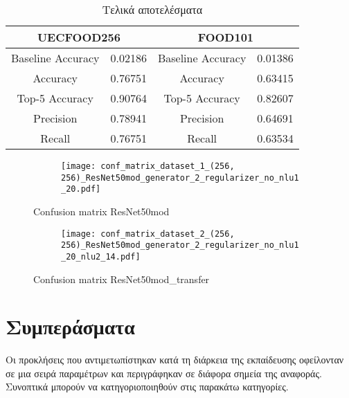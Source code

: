 \begin{table}[H]
\centering
\begin{tabular}{|cc|cc|}
\hline
\multicolumn{2}{|c|}{UECFOOD256}         & \multicolumn{2}{c|}{FOOD101}            \\ \hline
\multicolumn{1}{|c|}{Baseline Accuracy}  & 0.02186 & \multicolumn{1}{c|}{Baseline Accuracy}       & 0.01386 \\ \hline
\multicolumn{1}{|c|}{Accuracy}       & 0.76751 & \multicolumn{1}{c|}{Accuracy}       & 0.63415 \\ \hline
\multicolumn{1}{|c|}{Top-5 Accuracy} & 0.90764 & \multicolumn{1}{c|}{Top-5 Accuracy} & 0.82607 \\ \hline
\multicolumn{1}{|c|}{Precision}      & 0.78941 & \multicolumn{1}{c|}{Precision}      & 0.64691 \\ \hline
\multicolumn{1}{|c|}{Recall}         & 0.76751 & \multicolumn{1}{c|}{Recall}         & 0.63534 \\ \hline
\end{tabular}
\caption{Τελικά αποτελέσματα}
\label{final_results_table}
\end{table}


\begin{figure}[H]
\centering
\begin{subfigure}[t]{1.0\textwidth}%
\texttt{[image: conf\_matrix\_dataset\_1\_(256, 256)\_ResNet50mod\_generator\_2\_regularizer\_no\_nlu1\_20.pdf]}
\end{subfigure}
\caption{Confusion matrix ResNet50mod}
\label{confusion_matrix_fig_1}
\end{figure}


\begin{figure}[H]
\centering
\begin{subfigure}[t]{1.0\textwidth}%
\texttt{[image: conf\_matrix\_dataset\_2\_(256, 256)\_ResNet50mod\_generator\_2\_regularizer\_no\_nlu1\_20\_nlu2\_14.pdf]}
\end{subfigure}
\caption{Confusion matrix ResNet50mod\_transfer}
\label{confusion_matrix_fig_2}
\end{figure}



\section{Συμπεράσματα}
\label{Conclusions}

Οι προκλήσεις που αντιμετωπίστηκαν κατά τη διάρκεια της εκπαίδευσης οφείλονταν σε μια σειρά παραμέτρων και περιγράφηκαν σε διάφορα σημεία της αναφοράς. Συνοπτικά μπορούν να κατηγοριοποιηθούν στις παρακάτω κατηγορίες.

